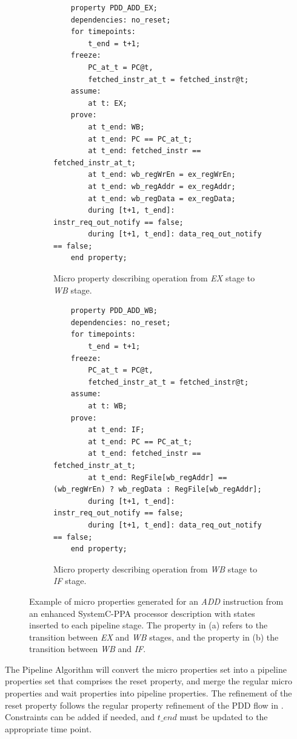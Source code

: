 \begin{figure}[htb!]
     \centering
     \begin{subfigure}[b]{\textwidth}
         \begin{lstlisting}
    property PDD_ADD_EX;
    dependencies: no_reset;
    for timepoints:
        t_end = t+1;
    freeze:
        PC_at_t = PC@t,
        fetched_instr_at_t = fetched_instr@t;
    assume:
        at t: EX;
    prove:
        at t_end: WB;
        at t_end: PC == PC_at_t;
        at t_end: fetched_instr == fetched_instr_at_t;
        at t_end: wb_regWrEn = ex_regWrEn;
        at t_end: wb_regAddr = ex_regAddr;
        at t_end: wb_regData = ex_regData;
        during [t+1, t_end]: instr_req_out_notify == false;
        during [t+1, t_end]: data_req_out_notify == false;
    end property;\end{lstlisting}
         \caption{Micro property describing operation from \textit{EX} stage to \textit{WB} stage.}
         \label{subfig:add-ex-micro-ppt}
     \end{subfigure}
     \hfill
     \begin{subfigure}[b]{\textwidth}
         \begin{lstlisting}
    property PDD_ADD_WB;
    dependencies: no_reset;
    for timepoints:
        t_end = t+1;
    freeze:
        PC_at_t = PC@t,
        fetched_instr_at_t = fetched_instr@t;
    assume:
        at t: WB;
    prove:
        at t_end: IF;
        at t_end: PC == PC_at_t;
        at t_end: fetched_instr == fetched_instr_at_t;
        at t_end: RegFile[wb_regAddr] == (wb_regWrEn) ? wb_regData : RegFile[wb_regAddr];
        during [t+1, t_end]: instr_req_out_notify == false;
        during [t+1, t_end]: data_req_out_notify == false;
    end property;\end{lstlisting}
         \caption{Micro property describing operation from \textit{WB} stage to \textit{IF} stage.}
         \label{subfig:add-wb-micro-ppt}
     \end{subfigure}
        \caption{Example of micro properties generated for an \textit{ADD} instruction from an enhanced SystemC-PPA processor description with states inserted to each pipeline stage. The property in (a) refers to the transition between \textit{EX} and \textit{WB} stages, and the property in (b) the transition between \textit{WB} and \textit{IF}. }
        \label{fig:add-ex-wb-micro-ppt}
\end{figure}

The Pipeline Algorithm will convert the micro properties set into a pipeline properties set that comprises the reset property, and merge the regular micro properties and wait properties into pipeline properties. The refinement of the reset property follows the regular property refinement of the PDD flow in \cite{paper-pdd}. Constraints can be added if needed, and $t\_end$ must be updated to the appropriate time point.

